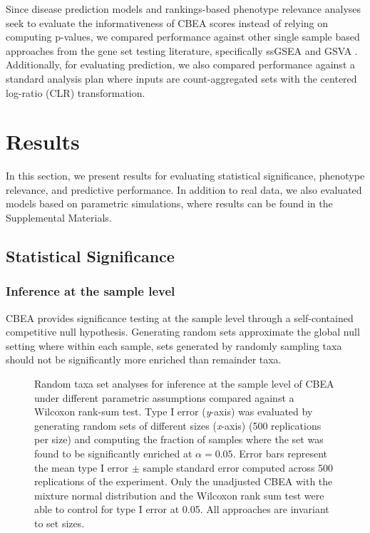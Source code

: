 Since disease prediction models and rankings-based phenotype relevance analyses seek to evaluate the informativeness of CBEA scores instead of relying on computing p-values, we compared performance against other single sample based approaches from the gene set testing literature, specifically ssGSEA \cite{barbie2009} and GSVA \cite{hanzelmann2013}. Additionally, for evaluating prediction, we also compared performance against a standard analysis plan where inputs are count-aggregated sets with the centered log-ratio (CLR) transformation. 

\section{Results}
In this section, we present results for evaluating statistical significance, phenotype relevance, and predictive performance. In addition to real data, we also evaluated models based on parametric simulations, where results can be found in the Supplemental Materials.   

\subsection{Statistical Significance}
\subsubsection{Inference at the sample level}
CBEA provides significance testing at the sample level through a self-contained competitive null hypothesis. Generating random sets approximate the global null setting where within each sample, sets generated by randomly sampling taxa should not be significantly more enriched than remainder taxa.   

\begin{figure}[!h]
    \centering
    \caption{Random taxa set analyses for inference at the sample level of CBEA under different parametric assumptions compared against a Wilcoxon rank-sum test. Type I error (\emph{y}-axis) was evaluated by generating random sets of different sizes (\emph{x}-axis) (500 replications per size) and computing the fraction of samples where the set was found to be significantly enriched at $\alpha = 0.05$. Error bars represent the mean type I error $\pm$ sample standard error computed across 500 replications of the experiment. Only the unadjusted CBEA with the mixture normal distribution and the Wilcoxon rank sum test were able to control for type I error at 0.05. All approaches are invariant to set sizes.} 
    \label{fig:2}
\end{figure}

